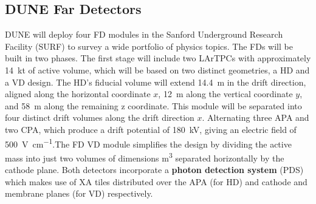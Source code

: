 \subsection{DUNE Far Detectors}
\ac{DUNE} will deploy four \ac{FD} modules in the Sanford Underground Research Facility (SURF) to survey a wide portfolio of physics topics. The \ac{FD}s will be built in two phases. The first stage will include two \ac{LArTPC}s with approximately \SI{14}{\kilo\tonne} of active volume, which will be based on two distinct geometries, a \ac{HD} and a \ac{VD} design. The \ac{HD}'s fiducial volume will extend \SI{14.4}{\meter} in the drift direction, aligned along the horizontal coordinate $x$, \SI{12}{\meter} along the vertical coordinate $y$, and \SI{58}{\meter} along the remaining z coordinate. This module will be separated into four distinct drift volumes along the drift direction $x$. Alternating three \ac{APA} and two \ac{CPA}, which produce a drift potential of \SI{180}{\kilo\volt}, giving an electric field of \SI{500}{\volt\per\centi\meter}.The \ac{FD} \ac{VD} module simplifies the design by dividing the active mass into just two volumes of dimensions \unit{\metre\cubed} separated horizontally by the cathode plane. Both detectors incorporate a \textbf{photon detection system} (PDS) which makes use of \ac{XA} tiles \cite{Machado_2018} distributed over the APA (for HD) and cathode and membrane planes (for VD) respectively.


